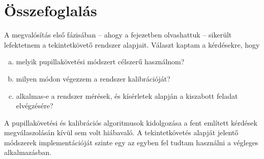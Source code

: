 \section{Összefoglalás}\label{sect:kiserlet_osszefoglalas}

A megvalósítás első fázisában -- ahogy a fejezetben olvashattuk -- sikerült lefektetnem a tekintetkövető rendszer alapjait. Választ kaptam a kérdésekre, hogy

\begin{enumerate}[a)]
 \item melyik pupillakövetési módszert célszerű használnom?
 \item milyen módon végezzem a rendszer kalibrációját?
 \item alkalmas-e a rendszer mérések, és kísérletek alapján a kiszabott feladat elvégzésére?
\end{enumerate} 

A pupillakövetési és kalibrációs algoritmusok kidolgozása a fent említett kérdések megválaszolásán kívül sem volt hiábavaló. A tekintetkövetés alapját jelentő módszerek implementációját szinte egy az egyben fel tudtam használni a végleges alkalmazásban.